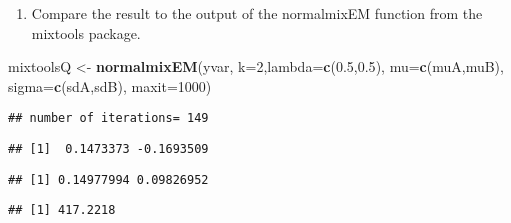 \documentclass[]{article}
\newenvironment{Shaded}{\begin{snugshade}}{\end{snugshade}}
\newcommand{\DataTypeTok}[1]{\textcolor[rgb]{0.13,0.29,0.53}{#1}}
\newcommand{\DecValTok}[1]{\textcolor[rgb]{0.00,0.00,0.81}{#1}}
\newcommand{\FloatTok}[1]{\textcolor[rgb]{0.00,0.00,0.81}{#1}}
\newcommand{\KeywordTok}[1]{\textcolor[rgb]{0.13,0.29,0.53}{\textbf{#1}}}
\newcommand{\NormalTok}[1]{#1}
\newcommand{\OperatorTok}[1]{\textcolor[rgb]{0.81,0.36,0.00}{\textbf{#1}}}
\newcommand{\StringTok}[1]{\textcolor[rgb]{0.31,0.60,0.02}{#1}}
\providecommand{\tightlist}{%
  \setlength{\itemsep}{0pt}\setlength{\parskip}{0pt}}
\begin{document}
\begin{enumerate}
\def\labelenumi{\alph{enumi}.}
\setcounter{enumi}{4}
\tightlist
\item
  Compare the result to the output of the normalmixEM function from the
  mixtools package.
\end{enumerate}

\begin{Shaded}
\begin{Highlighting}[]
\NormalTok{mixtoolsQ <-}\StringTok{ }\KeywordTok{normalmixEM}\NormalTok{(yvar, }\DataTypeTok{k=}\DecValTok{2}\NormalTok{,}\DataTypeTok{lambda=}\KeywordTok{c}\NormalTok{(}\FloatTok{0.5}\NormalTok{,}\FloatTok{0.5}\NormalTok{), }\DataTypeTok{mu=}\KeywordTok{c}\NormalTok{(muA,muB), }\DataTypeTok{sigma=}\KeywordTok{c}\NormalTok{(sdA,sdB),  }\DataTypeTok{maxit=}\DecValTok{1000}\NormalTok{)}
\end{Highlighting}
\end{Shaded}

\begin{verbatim}
## number of iterations= 149
\end{verbatim}

\begin{Shaded}
\end{Shaded}

\begin{verbatim}
## [1]  0.1473373 -0.1693509
\end{verbatim}

\begin{Shaded}
\end{Shaded}

\begin{verbatim}
## [1] 0.14977994 0.09826952
\end{verbatim}

\begin{Shaded}
\end{Shaded}

\begin{verbatim}
## [1] 417.2218
\end{verbatim}
\end{document}
